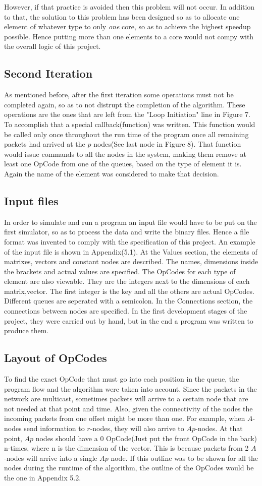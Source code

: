 \documentclass[12pt,a4paper]{article}
\begin{document}
However, if that practice is avoided then this problem will not occur. In addition to that, the solution to this problem has been designed so as to allocate one element of whatever type to only \emph{one} core, so as to achieve the highest speedup possible. Hence putting more than one elements to a core would not compy with the overall logic of this project.
\subsection{Second Iteration}
As mentioned before, after the first iteration some operations must not be completed again, so as to not distrupt the completion of the algorithm. These operations are the ones that are left from the "Loop Initiation" line in Figure 7. To accomplish that a special callback(function) was written. This function would be called only once throughout the run time of the program once all remaining packets had arrived at the $p$ nodes(See last node in Figure 8). That function would issue commands to all the nodes in the system, making them remove at least one OpCode from one of the queues, based on the type of element it is. Again the name of the element was considered to make that decision.
\subsection{Input files}
In order to simulate and run a program an input file would have to be put on the first simulator, so as to process the data and write the binary files. Hence a file format was invented to comply with the specification of this project. An example of the input file is shown in Appendix(5.1). At the Values section, the elements of matrixes, vectors and constant nodes are described. The names, dimensions inside the brackets and actual values are specified. The OpCodes for each type of element are also viewable. They are the integers next to the dimensions of each matrix,vector. The first integer is the key and all the others are actual OpCodes. Different queues are seperated with a semicolon. In the Connections section, the connections between nodes are specified. In the first development stages of the project, they were carried out by hand, but in the end a program was written to produce them.
\subsection{Layout of OpCodes}
To find the exact OpCode that must go into each position in the queue, the program flow and the algorithm were taken into account. Since the packets in the network are multicast, sometimes packets will arrive to a certain node that are not needed at that point and time. Also, given the connectivity of the nodes the incoming packets from one offset might be more than one. For example, when $A$-nodes send information to $r$-nodes, they will also arrive to $Ap$-nodes. At that point, $Ap$ nodes should have a 0 OpCode(Just put the front OpCode in the back) n-times, where n is the dimension of the vector. This is because packets from 2 $A$-nodes will arrive into a single $Ap$ node. If this outline was to be shown for all the nodes during the runtime of the algorithm, the outline of the OpCodes would be the one in Appendix 5.2.
\end{document}
